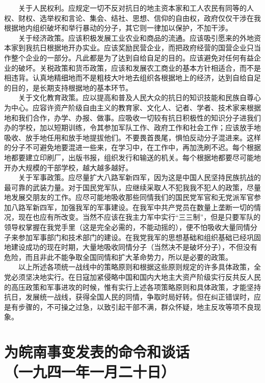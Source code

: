 \documentclass[cn,11pt,chinese]{elegantbook}
\def\myformat#1{\hfil\hfil #1}
\begin{document}
　　关于人民权利。应规定一切不反对抗日的地主资本家和工人农民有同等的人权、财权、选举权和言论、集会、结社、思想、信仰的自由权，政府仅仅干涉在我根据地内组织破坏和举行暴动的分子，其它则一律加以保护，不加干涉。\\
　　关于经济政策。应该积极发展工业农业和商品的流通。应该吸引愿来的外地资本家到我抗日根据地开办实业。应该奖励民营企业，而把政府经营的国营企业只当作整个企业的一部分。凡此都是为了达到自给自足的目的。应该避免对任何有益企业的破坏。关税政策和货币政策，应该和发展农工商业的基本方针相适合，而不是相违背。认真地精细地而不是粗枝大叶地去组织各根据地上的经济，达到自给自足的目的，是长期支持根据地的基本环节。\\
　　关于文化教育政策。应以提高和普及人民大众的抗日的知识技能和民族自尊心为中心。应容许资产阶级自由主义的教育家、文化人、记者、学者、技术家来根据地和我们合作，办学、办报、做事。应吸收一切较有抗日积极性的知识分子进我们办的学校，加以短期训练，令其参加军队工作、政府工作和社会工作；应该放手地吸收、放手地任用和放手地提拔他们。不要畏首畏尾，惧怕反动分子混进来。这样的分子不可避免地要混进一些来，在学习中，在工作中，再加洗刷不迟。每个根据地都要建立印刷厂，出版书报，组织发行和输送的机关。每个根据地都要尽可能地开办大规模的干部学校，越大越多越好。\\
　　关于军事政策。应尽量扩大八路军新四军，因为这是中国人民坚持民族抗战的最可靠的武装力量。对于国民党军队，应继续采取人不犯我我不犯人的政策，尽量地发展交朋友的工作。应尽可能地吸收那些同情我们的国民党军官和无党派军官参加八路军新四军，加强我军的军事建设。在我军中共产党员在数量上垄断一切的情况，现在也应有所改变。当然不应该在我主力军中实行“三三制”，但是只要军队的领导权掌握在我党手里（这是完全必需的，不能动摇的），便不怕吸收大量同情分子来参加军事部门和技术部门的建设。在我党我军的思想基础和组织基础已经巩固地建设成功的现在时期，大量地吸收同情分子（当然决不是破坏分子），不但没有危险，而且非此不能争取全国同情和扩大革命势力，所以是必要的政策。\\
　　以上所述各项统一战线中的策略原则和根据这些原则规定的许多具体政策，全党必须坚决地实行。在日寇加紧侵略中国和国内大地主大资产阶级实行反共反人民的高压政策和军事进攻的时候，惟有实行上述各项策略原则和具体政策，才能坚持抗日，发展统一战线，获得全国人民的同情，争取时局好转。但在纠正错误时，应是有步骤的，不可操之过急，以致引起干部不满，群众怀疑，地主反攻等项不良现象。\\
\newpage\section*{\myformat{为皖南事变发表的命令和谈话}\\\myformat{（一九四一年一月二十日）}}
\end{document}
